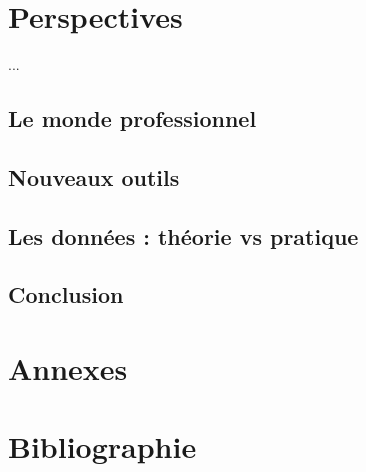 \documentclass{book}
\begin{document}
\newpage
\section{Perspectives}
...
\subsection{Le monde professionnel}
\subsection{Nouveaux outils}
\subsection{Les données : théorie vs pratique}

\newpage
\begin{center}
\section*{Conclusion}
\end{center}

\backmatter
\section{Annexes}
\section{Bibliographie}
\end{document}
